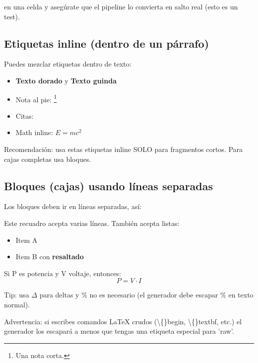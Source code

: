 \documentclass{sener2025}
\begin{document}
 en una celda y asegúrate que el pipeline lo convierta en salto real (esto es un test).


\subsection{Etiquetas inline (dentro de un párrafo)}

Puedes mezclar etiquetas dentro de texto:
\begin{itemize}
  \item \textbf{\textcolor{gobmxDorado}{Texto dorado}} y \textbf{\textcolor{gobmxGuinda}{Texto guinda}}
  \item Nota al pie: \footnote{Una nota corta.}
  \item Citas: \cite{demo_sener2025}
  \item Math inline: $E = mc^2$
\end{itemize}
Recomendación: usa estas etiquetas inline SOLO para fragmentos cortos. Para cajas completas usa bloques.


\subsection{Bloques (cajas) usando líneas separadas}

Los bloques deben ir en líneas separadas, así:

\begin{recuadro}[title={Nota metodológica}]
Este recuadro acepta varias líneas.
También acepta listas:
\begin{itemize}
  \item Item A
  \item Item B con \textbf{\textcolor{gobmxDorado}{resaltado}}
\end{itemize}
\end{recuadro}

\begin{ejemplo}[title={Ejemplo de cálculo}]
Si P es potencia y V voltaje, entonces:
\begin{equation}
P = V\cdot I
\end{equation}

\end{ejemplo}

\begin{calloutTip}
Tip: usa $\Delta$ para deltas y $\%$ no es necesario (el generador debe escapar \% en texto normal).

\end{calloutTip}

\begin{calloutWarning}
Advertencia: si escribes comandos LaTeX crudos (\textbackslash\{\}begin, \textbackslash\{\}textbf, etc.) el generador los escapará a menos que tengas una etiqueta especial para 'raw'.

\end{calloutWarning}
\end{document}
